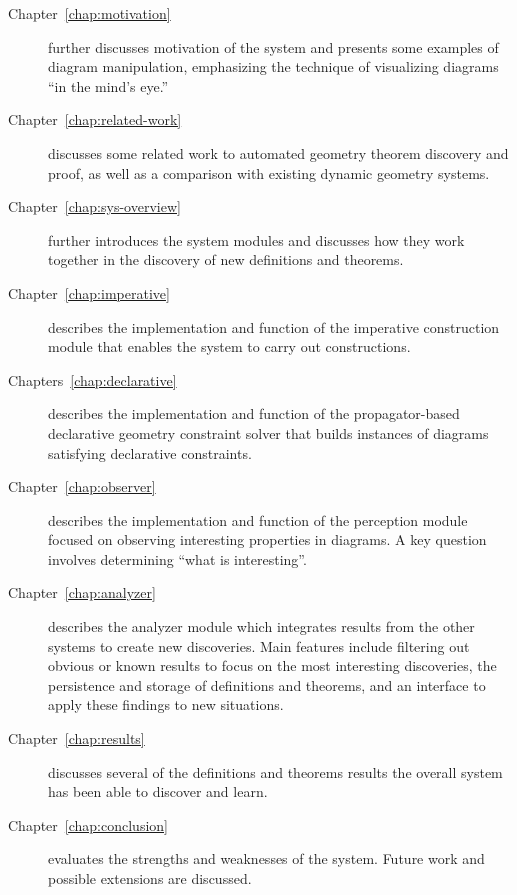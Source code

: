 \begin{description}

\item [Chapter~\ref{chap:motivation}] further discusses motivation of
  the system and presents some examples of diagram manipulation,
  emphasizing the technique of visualizing diagrams ``in the mind's
  eye.''

\item[Chapter~\ref{chap:related-work}] discusses some related work to
  automated geometry theorem discovery and proof, as well as a
  comparison with existing dynamic geometry systems.

\item[Chapter~\ref{chap:sys-overview}] further introduces the system
  modules and discusses how they work together in the discovery of new
  definitions and theorems.

\item[Chapter~\ref{chap:imperative}] describes the implementation and
  function of the imperative construction module that enables the
  system to carry out constructions.

\item[Chapters~\ref{chap:declarative}] describes the implementation
  and function of the propagator-based declarative geometry constraint
  solver that builds instances of diagrams satisfying declarative
  constraints.

\item[Chapter~\ref{chap:observer}] describes the implementation and
  function of the perception module focused on observing interesting
  properties in diagrams. A key question involves determining ``what
  is interesting''.

\item[Chapter~\ref{chap:analyzer}] describes the analyzer module which
  integrates results from the other systems to create new
  discoveries. Main features include filtering out obvious or known
  results to focus on the most interesting discoveries, the
  persistence and storage of definitions and theorems, and an
  interface to apply these findings to new situations.

\item[Chapter~\ref{chap:results}] discusses several of the definitions
  and theorems results the overall system has been able to discover
  and learn.

\item[Chapter~\ref{chap:conclusion}] evaluates the strengths and
  weaknesses of the system. Future work and possible extensions are
  discussed.

\end{description}
